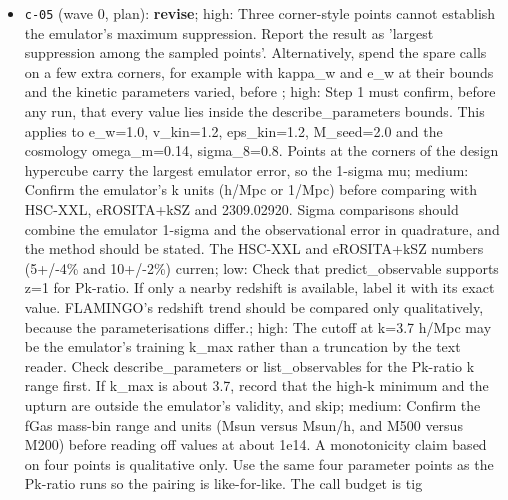 \documentclass[11pt,a4paper]{article}
\begin{document}
\begin{itemize}
  \item \texttt{c-05} (wave 0, plan): \textbf{revise}; high: Three corner-style points cannot establish the emulator's maximum suppression. Report the result as 'largest suppression among the sampled points'. Alternatively, spend the spare calls on a few extra corners, for example with kappa\_w and e\_w at their bounds and the kinetic parameters varied, before ; high: Step 1 must confirm, before any run, that every value lies inside the describe\_parameters bounds. This applies to e\_w=1.0, v\_kin=1.2, eps\_kin=1.2, M\_seed=2.0 and the cosmology omega\_m=0.14, sigma\_8=0.8. Points at the corners of the design hypercube carry the largest emulator error, so the 1-sigma mu; medium: Confirm the emulator's k units (h/Mpc or 1/Mpc) before comparing with HSC-XXL, eROSITA+kSZ and 2309.02920. Sigma comparisons should combine the emulator 1-sigma and the observational error in quadrature, and the method should be stated. The HSC-XXL and eROSITA+kSZ numbers (5+/-4\% and 10+/-2\%) curren; low: Check that predict\_observable supports z=1 for Pk-ratio. If only a nearby redshift is available, label it with its exact value. FLAMINGO's redshift trend should be compared only qualitatively, because the parameterisations differ.; high: The cutoff at k=3.7 h/Mpc may be the emulator's training k\_max rather than a truncation by the text reader. Check describe\_parameters or list\_observables for the Pk-ratio k range first. If k\_max is about 3.7, record that the high-k minimum and the upturn are outside the emulator's validity, and skip; medium: Confirm the fGas mass-bin range and units (Msun versus Msun/h, and M500 versus M200) before reading off values at about 1e14. A monotonicity claim based on four points is qualitative only. Use the same four parameter points as the Pk-ratio runs so the pairing is like-for-like. The call budget is tig

\end{itemize}
\end{document}
